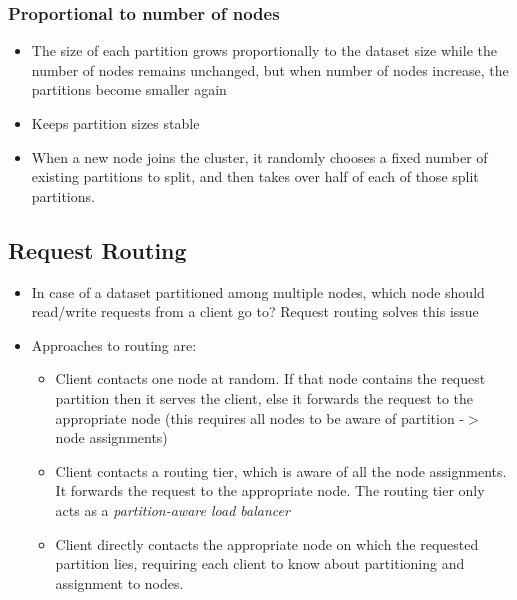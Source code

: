 \documentclass{article}
\begin{document}
\subsubsection{Proportional to number of nodes}
\begin{itemize}
    \item The size of each partition grows proportionally to the dataset size while the number of nodes remains unchanged, but when number of nodes increase, the partitions become smaller again
    
    \item Keeps partition sizes stable
    
    \item When a new node joins the cluster, it randomly chooses a fixed number of existing partitions to split, and then takes over half of each of those split partitions. 
\end{itemize}

\subsection{Request Routing}
\begin{itemize}
    \item In case of a dataset partitioned among multiple nodes, which node should read/write requests from a client go to? Request routing solves this issue
    
    \item Approaches to routing are:
    \begin{itemize}
        \item Client contacts one node at random. If that node contains the request partition then it serves the client, else it forwards the request to the appropriate node (this requires all nodes to be aware of partition -$>$ node assignments)
        
        \item Client contacts a routing tier, which is aware of all the node assignments. It forwards the request to the appropriate node. The routing tier only acts as a \textit{partition-aware load balancer}
        
        \item Client directly contacts the appropriate node on which the requested partition lies, requiring each client to know about partitioning and assignment to nodes. 
    \end{itemize}
\end{itemize}
\end{document}
